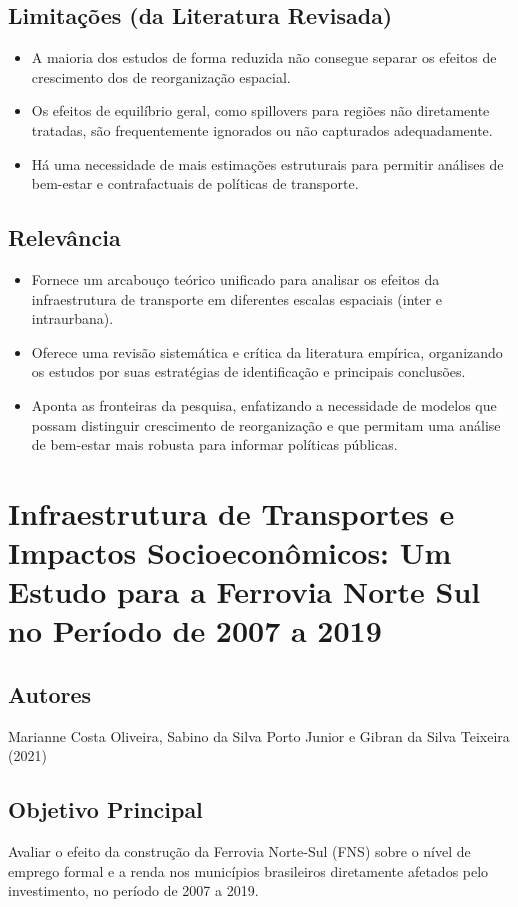 \documentclass[12pt]{article}
\begin{document}
\subsection*{Limitações (da Literatura Revisada)}
\begin{itemize}
    \item A maioria dos estudos de forma reduzida não consegue separar os efeitos de crescimento dos de reorganização espacial.
    \item Os efeitos de equilíbrio geral, como spillovers para regiões não diretamente tratadas, são frequentemente ignorados ou não capturados adequadamente.
    \item Há uma necessidade de mais estimações estruturais para permitir análises de bem-estar e contrafactuais de políticas de transporte.
\end{itemize}

\subsection*{Relevância}
\begin{itemize}
    \item Fornece um arcabouço teórico unificado para analisar os efeitos da infraestrutura de transporte em diferentes escalas espaciais (inter e intraurbana).
    \item Oferece uma revisão sistemática e crítica da literatura empírica, organizando os estudos por suas estratégias de identificação e principais conclusões.
    \item Aponta as fronteiras da pesquisa, enfatizando a necessidade de modelos que possam distinguir crescimento de reorganização e que permitam uma análise de bem-estar mais robusta para informar políticas públicas.
\end{itemize}
\newpage

\section{Infraestrutura de Transportes e Impactos Socioeconômicos: Um Estudo para a Ferrovia Norte Sul no Período de 2007 a 2019}

\subsection*{Autores}
Marianne Costa Oliveira, Sabino da Silva Porto Junior e Gibran da Silva Teixeira (2021)

\subsection*{Objetivo Principal}
Avaliar o efeito da construção da Ferrovia Norte-Sul (FNS) sobre o nível de emprego formal e a renda nos municípios brasileiros diretamente afetados pelo investimento, no período de 2007 a 2019.
\end{document}
